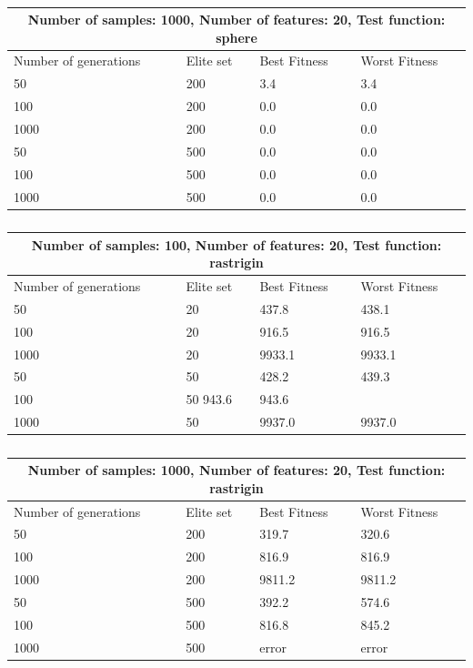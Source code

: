 \documentclass{article}
\begin{document}
\begin{table}[h]
	\begin{tabular}{ |p{3cm}||p{3cm}|p{3cm}|p{3cm}|  }
		\hline
		\multicolumn{4}{|c|}{Number of samples: 1000,  Number of features: 20, Test function: sphere} \\
		\hline
		Number of generations& Elite set & Best Fitness & Worst Fitness\\
		\hline
		50   & 200    &3.4&3.4\\
		100 &   200  & 0.0   & 0.0\\
		1000 & 200 & 0.0& 0.0\\
		50    &500 & 0.0& 0.0\\
		100&   500  & 0.0& 0.0\\
		1000& 500  & 0.0   & 0.0\\
		
		\hline
	\end{tabular} 
	\caption{\label{tab:table6} }
\end{table}


\begin{table}[h]
	\begin{tabular}{ |p{3cm}||p{3cm}|p{3cm}|p{3cm}|  }
		\hline
		\multicolumn{4}{|c|}{Number of samples: 100,  Number of features: 20, Test function: rastrigin} \\
		\hline
		Number of generations& Elite set & Best Fitness & Worst Fitness\\
		\hline
		50   & 20    &437.8& 438.1\\
		100 &   20  & 916.5   &916.5\\
		1000 & 20 &9933.1&  9933.1\\
		50    &50 & 428.2& 439.3\\
		100&   50  943.6& 943.6\\
		1000& 50  &9937.0   &9937.0\\
		
		\hline
	\end{tabular} 
	\caption{\label{tab:table5.1} }
\end{table}

\begin{table}[h]
	\begin{tabular}{ |p{3cm}||p{3cm}|p{3cm}|p{3cm}|  }
		\hline
		\multicolumn{4}{|c|}{Number of samples: 1000,  Number of features: 20, Test function: rastrigin} \\
		\hline
		Number of generations& Elite set & Best Fitness & Worst Fitness\\
		\hline
		50   & 200    &319.7&320.6\\
		100 &   200  & 816.9   & 816.9\\
		1000 & 200 &9811.2& 9811.2\\
		50    &500 & 392.2& 574.6\\
		100&   500  &816.8& 845.2\\
		1000& 500  & error  & error\\
		
		\hline
	\end{tabular} 
	\caption{\label{tab:table6.1} }
\end{table}
\end{document}
